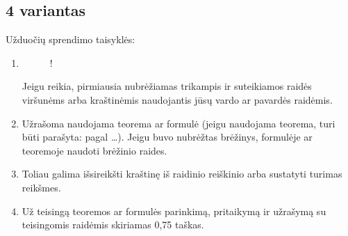 \documentclass[a4paper]{article}
\newcommand{\germanqq}[1]{{\selectlanguage{german}\glqq#1\grqq\selectlanguage{english}}}
\begin{document}

\subsection*{4 variantas}

Užduočių sprendimo taisyklės:

\begin{enumerate}[label= (\alph*)]

      \item

            \begin{adjustbox}{minipage={\linewidth}, valign=t}

                  \begin{wrapfigure}{t}{0.17\linewidth}

                        \begin{resizebox}{0.17\textwidth}{!}{
                                    }
                        \end{resizebox}
                        \vspace{-2\baselineskip}

                  \end{wrapfigure}

                  \vspace*{0.15em}

                  Jeigu reikia, pirmiausia nubrėžiamas trikampis ir suteikiamos
                  raidės viršunėms arba kraštinėmis naudojantis jūsų vardo ar
                  pavardės raidėmis.
            \end{adjustbox}

      \item \parbox{0.8\textwidth}{
                  Užrašoma naudojama teorema ar formulė (jeigu
                  naudojama teorema, turi būti parašyta: \germanqq{pagal
                        \ldots }). Jeigu buvo nubrėžtas brėžinys, formulėje ar
                  teoremoje naudoti brėžinio raides.
            }

      \item \parbox{0.7\textwidth}{
                  Toliau galima išsireikšti kraštinę iš
                  raidinio reiškinio arba sustatyti turimas
                  reikšmes.
            }

      \item \parbox{0.7\textwidth}{ Už teisingą teoremos ar formulės parinkimą,
                  pritaikymą ir užrašymą su teisingomis raidėmis skiriamas 0,75
                  taškas.}
\end{enumerate}
\end{document}
